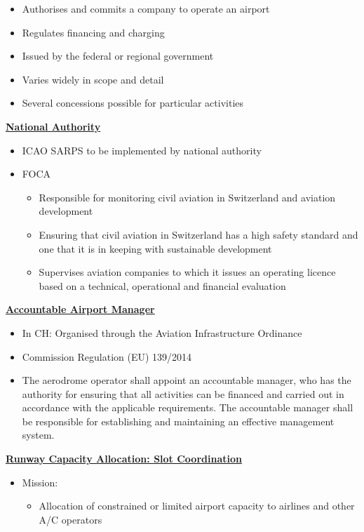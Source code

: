 \documentclass[9pt, landscape, fleqn]{scrartcl}
\begin{document}
\begin{multicols*}{3}
\begin{itemize}
\begin{itemize}
        \item Authorises and commits a company to operate an airport 
        \item Regulates financing and charging 
        \item Issued by the federal or regional government 
        \item Varies widely in scope and detail 
        \item Several concessions possible for particular activities 
    \end{itemize}
\end{itemize}
\underline{\textbf{National Authority}}
\begin{itemize}
    \item ICAO SARPS to be implemented by national authority 
    \item FOCA 
    \begin{itemize}
        \item Responsible for monitoring civil aviation in Switzerland and aviation development
        \item Ensuring that civil aviation in Switzerland has a high safety standard and one that it is in keeping with sustainable development
        \item Supervises aviation companies to which it issues an operating licence based on a technical, operational and financial evaluation
    \end{itemize}
\end{itemize}
\underline{\textbf{Accountable Airport Manager}}
\begin{itemize}
    \item In CH: Organised through the Aviation Infrastructure Ordinance 
    \item Commission Regulation (EU) 139/2014
    \item The aerodrome operator shall appoint an accountable manager, who has the authority for ensuring that all activities can be financed and carried out in accordance with the applicable requirements. The accountable manager shall be responsible for establishing and maintaining an effective management system.
\end{itemize}
\underline{\textbf{Runway Capacity Allocation: Slot Coordination}}
\begin{itemize}
    \item Mission: 
    \begin{itemize}
        \item Allocation of constrained or limited airport capacity to airlines and other A/C operators 

\end{itemize}
\end{itemize}
\end{multicols*}
\end{document}
